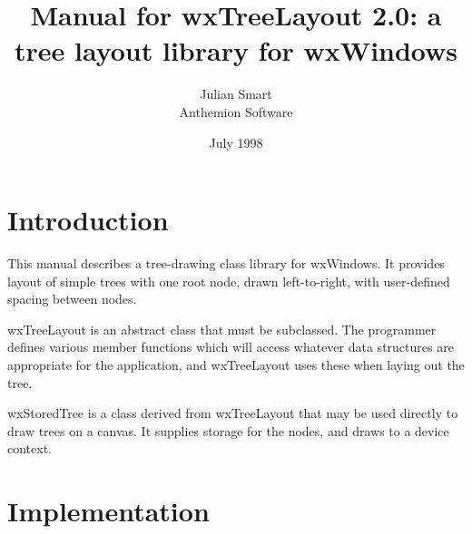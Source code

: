 %
\newcommand{\indexit}[1]{#1\index{#1}}%
\newcommand{\pipe}[0]{$\|$\ }%
%
%
%
%
%
%
%
%

\parskip=10pt%
\title{Manual for wxTreeLayout 2.0: a tree layout library for wxWindows}
\author{Julian Smart\\Anthemion Software}
\date{July 1998}%
\makeindex%
%
\maketitle

\pagestyle{fancyplain}

\setfooter{\thepage}{}{}{}{}{\thepage}
\tableofcontents%

\chapter{Introduction}
%
%
\setfooter{\thepage}{}{}{}{}{\thepage}

This manual describes a tree-drawing class library for wxWindows. It
provides layout of simple trees with one root node, drawn left-to-right,
with user-defined spacing between nodes.

wxTreeLayout is an abstract class that must be subclassed. The programmer
defines various member functions which will access whatever data structures
are appropriate for the application, and wxTreeLayout uses these when laying
out the tree.

wxStoredTree is a class derived from wxTreeLayout that may be used directly to
draw trees on a canvas. It supplies storage for the nodes, and draws
to a device context.


\chapter{Implementation}
%
\setfooter{\thepage}{}{}{}{}{\thepage}

